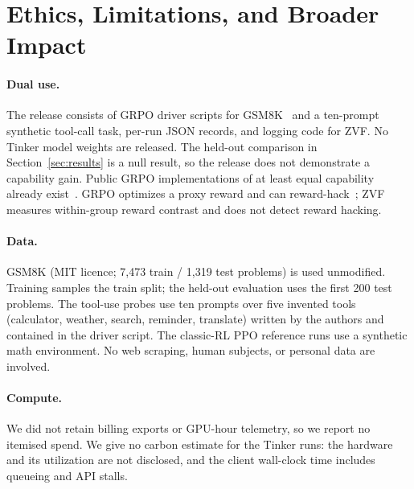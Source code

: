 \section{Ethics, Limitations, and Broader Impact}
\label{sec:impact_standalone}

\paragraph{Dual use.}
The release consists of GRPO driver scripts for GSM8K~\cite{cobbe2021training}
and a ten-prompt synthetic tool-call task, per-run JSON records, and logging
code for ZVF. No Tinker model weights are released. The held-out
comparison in Section~\ref{sec:results} is a null result, so the release does
not demonstrate a capability gain. Public GRPO implementations of at least
equal capability already exist~\cite{shao2024deepseekmath,vonwerra2022trl}.
GRPO optimizes a proxy reward and can reward-hack~\cite{skalse2022specificationgaming};
ZVF measures within-group reward contrast and does not detect reward hacking.

\paragraph{Data.}
GSM8K (MIT licence; 7{,}473 train / 1{,}319 test problems) is used unmodified.
Training samples the train split; the held-out evaluation uses the first 200
test problems. The tool-use probes use ten prompts over five invented tools
(calculator, weather, search, reminder, translate) written by the authors and
contained in the driver script. The classic-RL PPO reference runs use a
synthetic math environment. No web scraping, human subjects, or personal data
are involved.

\paragraph{Compute.}
We did not retain billing exports or GPU-hour telemetry, so we report no
itemised spend. We give no carbon estimate for the Tinker runs: the hardware and its utilization are not disclosed, and the
client wall-clock time includes queueing and API stalls.

